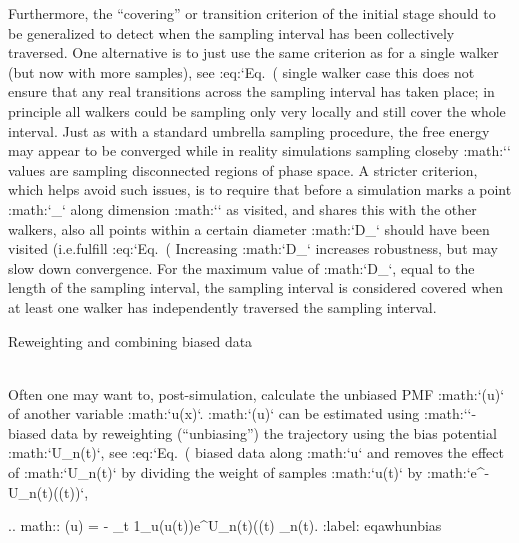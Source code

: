 Furthermore, the “covering” or transition criterion of the initial stage
should to be generalized to detect when the sampling interval has been
collectively traversed. One alternative is to just use the same
criterion as for a single walker (but now with more samples), see
:eq:`Eq. (%
single walker case this does not ensure that any real transitions across
the sampling interval has taken place; in principle all walkers could be
sampling only very locally and still cover the whole interval. Just as
with a standard umbrella sampling procedure, the free energy may appear
to be converged while in reality simulations sampling closeby
:math:`\lambda` values are sampling disconnected regions of phase space.
A stricter criterion, which helps avoid such issues, is to require that
before a simulation marks a point :math:`\lambda_{\mu}` along dimension
:math:`\mu` as visited, and shares this with the other walkers, also all
points within a certain diameter :math:`D_{}` should have
been visited (i.e.fulfill :eq:`Eq. (%
Increasing :math:`D_{}` increases robustness, but may slow
down convergence. For the maximum value of :math:`D_{}`,
equal to the length of the sampling interval, the sampling interval is
considered covered when at least one walker has independently traversed
the sampling interval.

Reweighting and combining biased data
~~~~~~~~~~~~~~~~~~~~~~~~~~~~~~~~~~~~~

Often one may want to, post-simulation, calculate the unbiased PMF
:math:`\Phi(u)` of another variable :math:`u(x)`. :math:`\Phi(u)` can be
estimated using :math:`\xi`-biased data by reweighting (“unbiasing”) the
trajectory using the bias potential :math:`U_{n(t)}`, see
:eq:`Eq. (%
biased data along :math:`u` and removes the effect of :math:`U_{n(t)}`
by dividing the weight of samples :math:`u(t)` by
:math:`e^{-U_{n(t)}(\xi(t))}`,

.. math:: \hat{\Phi}(u)  = -\ln 
          \sum_t 1_u(u(t))e^{U_{n(t)}(\xi(t)} _{n(t)}.
          :label: eqawhunbias

